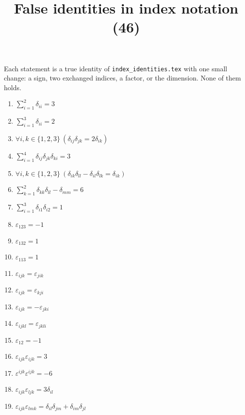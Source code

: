 \documentclass[11pt,a4paper]{article}
\title{False identities in index notation (46)}
\author{}
\date{}
\begin{document}
\maketitle
Each statement is a true identity of \texttt{index\_identities.tex} with one small change: a sign, two exchanged indices, a factor, or the dimension. None of them holds.

\begin{enumerate}
\item $\displaystyle \sum_{i=1}^{2} \delta_{ii} = 3$
\item $\displaystyle \sum_{i=1}^{3} \delta_{ii} = 2$
\item $\displaystyle \forall i, k \in \{1, 2, 3\}\ \left( \delta_{ij}\delta_{jk} = 2\delta_{ik} \right)$
\item $\displaystyle \sum_{i=1}^{4} \delta_{ij}\delta_{jk}\delta_{ki} = 3$
\item $\displaystyle \forall i, k \in \{1, 2, 3\}\ \left( \delta_{ik}\delta_{ll} - \delta_{il}\delta_{lk} = \delta_{ik} \right)$
\item $\displaystyle \sum_{k=1}^{2} \delta_{kk}\delta_{ll} - \delta_{mm} = 6$
\item $\displaystyle \sum_{i=1}^{3} \delta_{i1}\delta_{i2} = 1$
\item $\displaystyle \varepsilon_{123} = -1$
\item $\displaystyle \varepsilon_{132} = 1$
\item $\displaystyle \varepsilon_{113} = 1$
\item $\displaystyle \varepsilon_{ijk} = \varepsilon_{jik}$
\item $\displaystyle \varepsilon_{ijk} = \varepsilon_{kji}$
\item $\displaystyle \varepsilon_{ijk} = -\varepsilon_{jki}$
\item $\displaystyle \varepsilon_{ijkl} = \varepsilon_{jkli}$
\item $\displaystyle \varepsilon_{12} = -1$
\item $\displaystyle \varepsilon_{ijk}\varepsilon_{ijk} = 3$
\item $\displaystyle \varepsilon^{ijk}\varepsilon^{ijk} = -6$
\item $\displaystyle \varepsilon_{ijk}\varepsilon_{ljk} = 3\delta_{il}$
\item $\displaystyle \varepsilon_{ijk}\varepsilon_{lmk} = \delta_{il}\delta_{jm} + \delta_{im}\delta_{jl}$

\end{enumerate}
\end{document}
